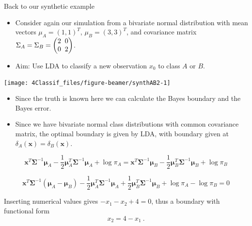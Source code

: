 \documentclass[10pt,ignorenonframetext,]{beamer}
\begin{document}
\begin{frame}

\begin{block}{Back to our synthetic example}

\begin{itemize}
\item
  Consider again our simulation from a bivariate normal distribution
  with mean vectors \(\mu_A = (1, 1)^T\), \(\mu_B = (3, 3)^T\), and
  covariance matrix
  \(\Sigma_A = \Sigma_B = \begin{pmatrix} 2\hspace{2mm} 0 \\ 0 \hspace{2mm} 2 \end{pmatrix}\).
\item
  Aim: Use LDA to classify a new observation \(x_0\) to class \(A\) or
  \(B\).
\end{itemize}

\begin{center}\texttt{[image: 4Classif\_files/figure-beamer/synthAB2-1]} \end{center}

\end{block}

\end{frame}

\begin{frame}

\begin{itemize}
\item
  Since the truth is known here we can calculate the Bayes boundary and
  the Bayes error.
\item
  Since we have bivariate normal class distributions with common
  covariance matrix, the optimal boundary is given by LDA, with boundary
  given at \(\delta_A({\boldsymbol x})=\delta_B({\boldsymbol x})\).
\end{itemize}

\[{\boldsymbol x}^T \boldsymbol{\Sigma}^{-1}\boldsymbol\mu_A - \frac{1}{2}\boldsymbol\mu_A^T \boldsymbol{\Sigma}^{-1}\boldsymbol\mu_A + \log \pi_A={\boldsymbol x}^T \boldsymbol{\Sigma}^{-1}\boldsymbol\mu_B - \frac{1}{2}\boldsymbol\mu_B^T \boldsymbol{\Sigma}^{-1}\boldsymbol\mu_B + \log \pi_B\]

\[{\boldsymbol x}^T\boldsymbol{\Sigma}^{-1}(\boldsymbol\mu_A -\boldsymbol\mu_B)-\frac{1}{2}\boldsymbol\mu_A^T \boldsymbol{\Sigma}^{-1}\boldsymbol\mu_A +\frac{1}{2}\boldsymbol\mu_B^T \boldsymbol{\Sigma}^{-1}\boldsymbol\mu_B +\log \pi_A-\log \pi_B=0\]

Inserting numerical values gives \(-x_1-x_2+4=0\), thus a boundary with
functional form \[x_2=4-x_1 \ .\]

\end{frame}
\end{document}
